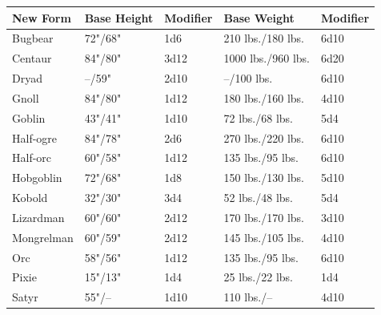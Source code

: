\noindent
\begin{minipage}{\textwidth}

\noindent
{}
\begin{tabular}{|p{}|p{}|p{}|p{}|p{}|}
\hline
New Form	& Base Height	& Modifier	& Base Weight	& Modifier \\
\hline\hline
\rowcolor[gray]{0.9}Bugbear	& 72"/68"	& 1d6	& 210 lbs./180 lbs.	& 6d10 \\
Centaur	& 84"/80"	& 3d12	& 1000 lbs./960 lbs.	& 6d20 \\
\rowcolor[gray]{0.9}Dryad	& --/59"	& 2d10	& --/100 lbs.	& 6d10 \\
Gnoll	& 84"/80"	& 1d12	& 180 lbs./160 lbs.	& 4d10 \\
\rowcolor[gray]{0.9}Goblin	& 43"/41"	& 1d10	& 72 lbs./68 lbs.	& 5d4 \\
Half-ogre	& 84"/78"	& 2d6	& 270 lbs./220 lbs.	& 6d10 \\
\rowcolor[gray]{0.9}Half-orc	& 60"/58"	& 1d12	& 135 lbs./95 lbs.	& 6d10 \\
Hobgoblin	& 72"/68"	& 1d8	& 150 lbs./130 lbs.	& 5d10 \\
\rowcolor[gray]{0.9}Kobold	& 32"/30"	& 3d4	& 52 lbs./48 lbs.	& 5d4 \\
Lizardman	& 60"/60"	& 2d12	& 170 lbs./170 lbs.	& 3d10 \\
\rowcolor[gray]{0.9}Mongrelman	& 60"/59"	& 2d12	& 145 lbs./105 lbs.	& 4d10 \\
Orc	& 58"/56"	& 1d12	& 135 lbs./95 lbs.	& 6d10 \\
\rowcolor[gray]{0.9}Pixie	& 15"/13"	& 1d4	& 25 lbs./22 lbs.	& 1d4 \\
Satyr	& 55"/--	& 1d10	& 110 lbs./--	& 4d10 \\
\hline
\end{tabular}

\end{minipage}

